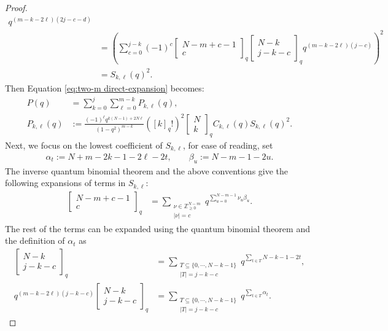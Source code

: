\documentclass[12pt]{amsart}
\theoremstyle{definition}
\theoremstyle{remark}
\numberwithin{equation}{section}
\numberwithin{figure}{section}
\begin{document}
\begin{proof}
\begin{align*}
q^{(m-k-2\ell)(2j-c-d)}\\
&=\left(
\sum_{c=0}^{j-k}(-1)^c
\begin{bmatrix}N-m+c-1\\c\end{bmatrix}_q
\begin{bmatrix}N-k\\j-k-c\end{bmatrix}_q
q^{(m-k-2\ell)(j-c)}
\right)^2\\
&=S_{k,\ell}(q)^2.
\end{align*}
Then Equation \eqref{eq:two-m direct-expansion} becomes:
\begin{align*}
    P(q) &= \sum_{k = 0}^j \sum_{\ell = 0}^{m-k} P_{k,\ell}(q), \\
    P_{k,\ell}(q) &:= \frac{(-1)^\ell q^{k(N-1)+2N\ell}}{(1-q^2)^{m-k}}
    ([k]_q!)^2 \begin{bmatrix}N\\k\end{bmatrix}_q C_{k,\ell}(q) S_{k,\ell}(q)^2.
\end{align*}
Next, we focus on the lowest coefficient of $S_{k,\ell}$, for ease of reading, set
\begin{align*}
    \alpha_t := N+m-2k-1-2\ell-2t, \qquad \beta_u := N-m-1-2u.
\end{align*}
The inverse quantum binomial theorem and the above conventions give the following expansions of terms in $S_{k,\ell}$:
\begin{align*}
    \begin{bmatrix}N-m+c-1\\c\end{bmatrix}_q
    &= \sum_{\substack{\nu \in \mathbb{Z}_{\ge 0}^{N-m}\\|\nu| = c}}
    q^{\sum_{u = 0}^{N-m-1}\nu_u\beta_u}.
\end{align*}
The rest of the terms can be expanded using the quantum binomial theorem and the definition of $\alpha_t$ as 
\begin{align*}
    \begin{bmatrix}N-k\\j-k-c\end{bmatrix}_q
    &= \sum_{\substack{T \subseteq \{0,\cdots,N-k-1\}\\|T| = j-k-c}}
    q^{\sum_{t \in T} N - k - 1 - 2t}, \\
    q^{(m-k-2\ell)(j-k-c)}\begin{bmatrix}N-k\\j-k-c\end{bmatrix}_q
    &= \sum_{\substack{T \subseteq \{0,\cdots,N-k-1\}\\|T| = j-k-c}}
    q^{\sum_{t \in T}\alpha_t}.
\end{align*}


\end{proof}
\end{document}
